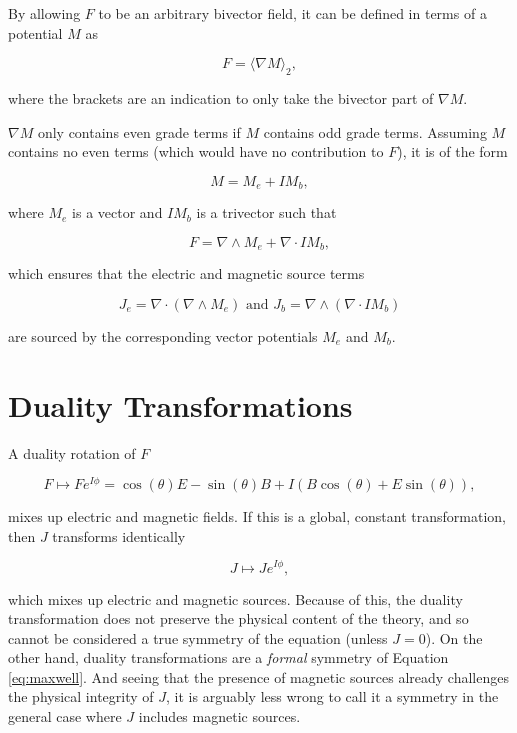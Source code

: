 \documentclass{article}
\begin{document}
  By allowing $F$ to be an arbitrary bivector field, it can be defined in terms of a potential $M$ as

  \begin{equation}
    F = \langle \nabla M \rangle_2,
  \end{equation}

  where the brackets are an indication to only take the bivector part of $\nabla M$.

  $\nabla M$ only contains even grade terms if $M$ contains odd grade terms. Assuming $M$ contains no even terms (which would have no contribution to $F$), it is of the form

  \begin{equation}
    M = M_e + I M_b, \label{eq:potential}
  \end{equation}

   where $M_e$ is a vector and $I M_b$ is a trivector such that

  \begin{equation}
    F = \nabla \wedge M_e + \nabla \cdot I M_b,
  \end{equation}

  which ensures that the electric and magnetic source terms 

  \begin{equation}
    J_e = \nabla \cdot (\nabla \wedge M_e) \text{ and } J_b = \nabla \wedge (\nabla \cdot I M_b)
  \end{equation} 

  are sourced by the corresponding vector potentials $M_e$ and $M_b$.

  \section{Duality Transformations}

  A duality rotation of $F$

  \begin{equation}
    F \mapsto F e^{I \phi} = \cos(\theta) E - \sin(\theta) B + I(B \cos(\theta) + E \sin(\theta)),\label{eq:duality}
  \end{equation}

  mixes up electric and magnetic fields. If this is a global, constant transformation, then $J$ transforms identically

  \begin{equation}
    J \mapsto J e^{I \phi},
  \end{equation}

  which mixes up electric and magnetic sources. Because of this, the duality transformation does not preserve the physical content of the theory, and so cannot be considered a true symmetry of the equation (unless $J=0$). On the other hand, duality transformations are a \emph{formal} symmetry of Equation \ref{eq:maxwell}. And seeing that the presence of magnetic sources already challenges the physical integrity of $J$, it is arguably less wrong to call it a symmetry in the general case where $J$ includes magnetic sources.
\end{document}
